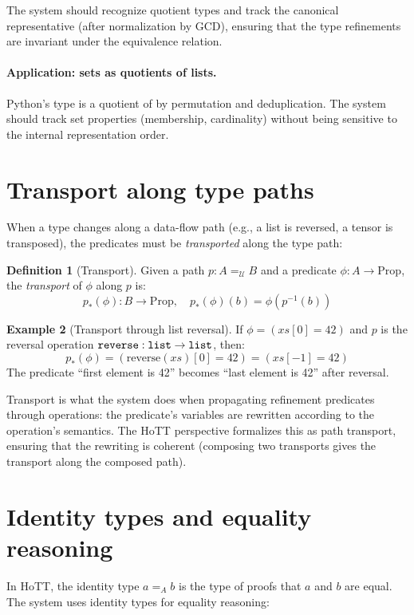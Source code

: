 \documentclass[11pt]{report}
\DeclareRobustCommand{\py}[1]{\texttt{\detokenize{#1}}}
\theoremstyle{definition}
\newtheorem{definition}{Definition}[section]
\newtheorem{example}[definition]{Example}
\theoremstyle{plain}
\begin{document}
The system should recognize quotient types and track the canonical
representative (after normalization by GCD), ensuring that the type
refinements are invariant under the equivalence relation.

\paragraph{Application: sets as quotients of lists.}
Python's \py{set} type is a quotient of \py{list} by permutation and
deduplication. The system should track set properties (membership, cardinality)
without being sensitive to the internal representation order.

\section{Transport along type paths}

When a type changes along a data-flow path (e.g., a list is reversed, a
tensor is transposed), the predicates must be \emph{transported} along the
type path:

\begin{definition}[Transport]
Given a path $p : A =_{\mathcal{U}} B$ and a predicate $\phi : A \to
\mathrm{Prop}$, the \emph{transport} of $\phi$ along $p$ is:
\[
  p_*(\phi) : B \to \mathrm{Prop}, \quad p_*(\phi)(b) = \phi(p^{-1}(b))
\]
\end{definition}

\begin{example}[Transport through list reversal]
If $\phi = (xs[0] = 42)$ and $p$ is the reversal operation
$\py{reverse} : \py{list} \to \py{list}$, then:
\[
  p_*(\phi) = (\mathrm{reverse}(xs)[0] = 42) = (xs[-1] = 42)
\]
The predicate ``first element is 42'' becomes ``last element is 42'' after
reversal.
\end{example}

Transport is what the system does when propagating refinement predicates
through operations: the predicate's variables are rewritten according to the
operation's semantics. The HoTT perspective formalizes this as path transport,
ensuring that the rewriting is coherent (composing two transports gives the
transport along the composed path).

\section{Identity types and equality reasoning}

In HoTT, the identity type $a =_A b$ is the type of proofs that $a$ and $b$
are equal. The system uses identity types for equality reasoning:
\end{document}
